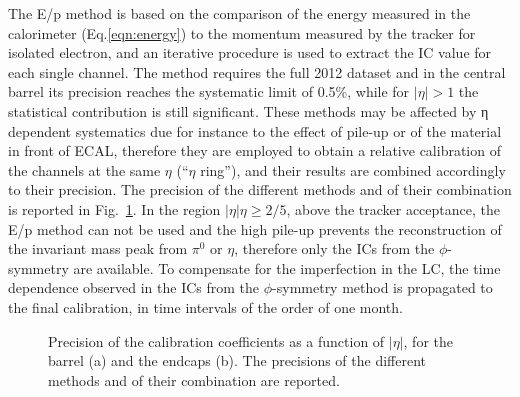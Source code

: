 \documentclass[journal]{IEEEtran}
\begin{document}
The E/p method is based on the comparison of the energy measured in the calorimeter (Eq.\ref{eqn:energy}) to the momentum measured by the tracker for isolated electron, and an iterative procedure is used to extract the IC value for each single channel. The method requires the full 2012 dataset and in the central barrel its precision reaches the systematic limit of 0.5\%, while for $\vert\eta\vert>1$ the statistical contribution is still significant.
These methods may be affected by η dependent systematics due for instance to the effect of pile-up or of the material in front of ECAL, therefore they are employed to obtain a relative calibration of the channels at the same $\eta$ (``$\eta$ ring''), and their results are combined accordingly to their precision. The precision of the different methods and of their combination is reported in Fig.~\ref{fig:intercalib}. In the region $\vert\eta\vert\eta\ge2/5$, above the tracker acceptance, the E/p method can not be used and the high pile-up prevents the reconstruction of the invariant mass peak from $\pi^0$ or $\eta$, therefore only the ICs from the $\phi$-symmetry are available.
To compensate for the imperfection in the LC, the time dependence observed in the ICs from the $\phi$-symmetry method is propagated to the final calibration, in time intervals of the order of one month.
%
\begin{figure}[!t]
  \begin{center}
    \caption{Precision of the calibration coefficients as a function of $\vert\eta\vert$, for the barrel (a) and the endcaps (b). The precisions of the different methods and of their combination are reported. \label{fig:intercalib}}
  \end{center}
\end{figure}
%
\end{document}
